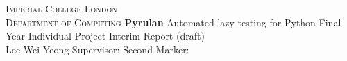 
\begin{titlepage}
\begin{center}
\textsc{\Large Imperial College London\\Department of Computing}
\vfil
{\Huge{\textbf{Pyrulan}}}\linebreak \linebreak
{\huge Automated lazy testing for Python}
\vfil
{\LARGE Final Year Individual Project}\linebreak \linebreak
{\LARGE Interim Report (draft)}\\[2cm]
{\Large Lee Wei Yeong }
\vfil
{\Large Supervisor: \supervisor} \linebreak \linebreak
{\Large Second Marker: \secondmarker}
\vfil
{\Large \monthname\ \number\year}
\end{center}
\end{titlepage}
